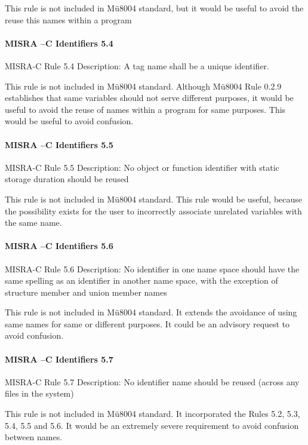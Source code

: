 This rule is not included in Mü8004 standard, but it would be useful to avoid the reuse this names within a program


\paragraph{MISRA –C Identifiers 5.4}
MISRA-C Rule 5.4 Description: A tag name shall be a unique identifier.

This rule is not included in Mü8004 standard. Although Mü8004 Rule 0.2.9 establishes that same variables should not serve different purposes, it would be useful to avoid the reuse of names within a program for same purposes. This would be useful to avoid confusion.


\paragraph{MISRA –C Identifiers 5.5}
MISRA-C Rule 5.5 Description: No object or function identifier with static storage duration should be reused

This rule is not included in Mü8004 standard. This rule would be useful, because the possibility exists for the user to incorrectly associate unrelated variables with the same name.

\paragraph{MISRA –C Identifiers 5.6}
MISRA-C Rule 5.6 Description: No identifier in one name space should have the same spelling as an identifier in another name space, with the exception of structure member and union member names

This rule is not included in Mü8004 standard. It extends the avoidance of using same names for same or different purposes. It could be an advisory request to avoid confusion.

\paragraph{MISRA –C Identifiers 5.7}
MISRA-C Rule 5.7 Description: No identifier name should be reused (across any files in the system)

This rule is not included in Mü8004 standard. It incorporated the Rules 5.2, 5.3, 5.4, 5.5 and 5.6. It would be an extremely severe requirement to avoid confusion between names.

